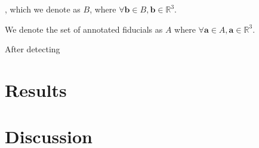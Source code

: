 \documentclass[12pt]{article}
\begin{document}
, which we denote as $B$, where $\forall \mathbf{b} \in B, \mathbf{b} \in \mathbb{R}^3$.

We denote the set of annotated fiducials as $A$ where $\forall \mathbf{a} \in A, \mathbf{a} \in \mathbb{R}^3$.



After detecting 

\section*{Results}

\section*{Discussion}



\end{document}
